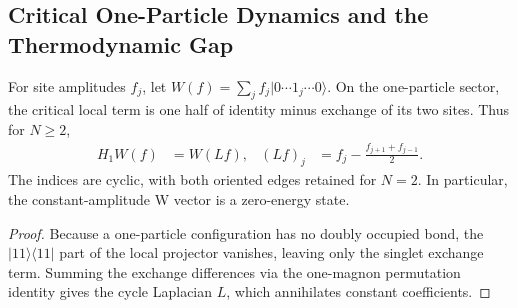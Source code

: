 \subsection{Critical One-Particle Dynamics and the Thermodynamic Gap}
\label{sec:pvbs_critical_gap}

\begin{lemma}
    \label{thm:pvbs_one_particle_dynamics}
    \leanok
    For site amplitudes $f_j$, let
    $W(f)=\sum_j f_j|0\cdots1_j\cdots0\rangle$.
    On the one-particle sector, the critical local term is one half
    of identity minus exchange of its two sites. Thus for $N\ge2$,
    \begin{align}
        H_1W(f) & =W(Lf),
                & (Lf)_j  & =f_j-\frac{f_{j+1}+f_{j-1}}2.
        \label{eq:pvbs_one_particle_laplacian}
    \end{align}
    The indices are cyclic, with both oriented edges retained for $N=2$.
    In particular, the constant-amplitude W vector is a zero-energy state.
\end{lemma}
\begin{proof}
    \leanok
    Because a one-particle configuration has no doubly occupied bond, the
    $|11\rangle\langle11|$ part of the local projector vanishes, leaving only
    the singlet exchange term. Summing the exchange differences via the
    one-magnon permutation identity gives the cycle Laplacian $L$, which
    annihilates constant coefficients.
\end{proof}

